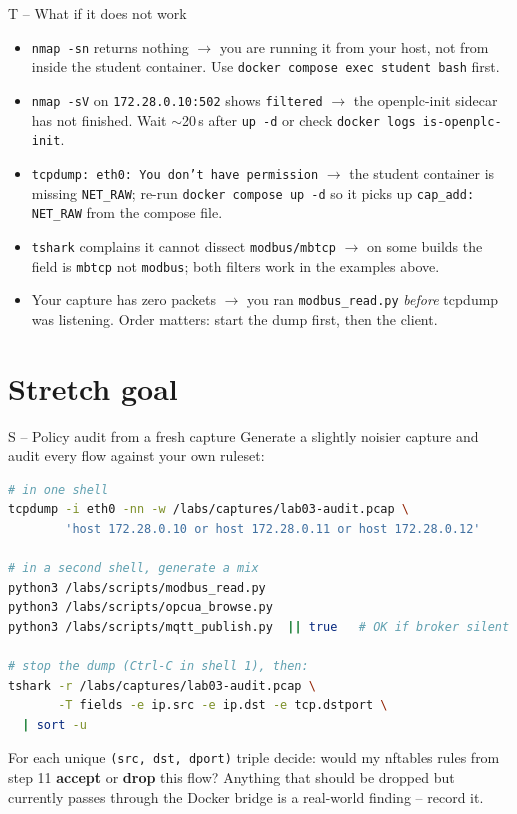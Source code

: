 \documentclass[11pt,a4paper]{article}
\begin{document}
\begin{stepbox}{T -- What if it does not work}
\begin{itemize}\setlength{\itemsep}{2pt}
  \item \texttt{nmap -sn} returns nothing $\rightarrow$ you are running it
        from your host, not from inside the student container. Use
        \texttt{docker compose exec student bash} first.
  \item \texttt{nmap -sV} on \texttt{172.28.0.10:502} shows
        \texttt{filtered} $\rightarrow$ the openplc-init sidecar has not
        finished. Wait $\sim$20\,s after \texttt{up -d} or check
        \texttt{docker logs is-openplc-init}.
  \item \texttt{tcpdump: eth0: You don't have permission} $\rightarrow$
        the student container is missing \texttt{NET\_RAW}; re-run
        \texttt{docker compose up -d} so it picks up
        \texttt{cap\_add: NET\_RAW} from the compose file.
  \item \texttt{tshark} complains it cannot dissect
        \texttt{modbus/mbtcp} $\rightarrow$ on some builds the field
        is \texttt{mbtcp} not \texttt{modbus}; both filters work in the
        examples above.
  \item Your capture has zero packets $\rightarrow$ you ran
        \texttt{modbus\_read.py} \emph{before} tcpdump was listening.
        Order matters: start the dump first, then the client.
\end{itemize}
\end{stepbox}

\section*{Stretch goal}

\begin{stepbox}{S -- Policy audit from a fresh capture}
Generate a slightly noisier capture and audit every flow against your
own ruleset:
\begin{lstlisting}[language=bash]
# in one shell
tcpdump -i eth0 -nn -w /labs/captures/lab03-audit.pcap \
        'host 172.28.0.10 or host 172.28.0.11 or host 172.28.0.12'

# in a second shell, generate a mix
python3 /labs/scripts/modbus_read.py
python3 /labs/scripts/opcua_browse.py
python3 /labs/scripts/mqtt_publish.py  || true   # OK if broker silent

# stop the dump (Ctrl-C in shell 1), then:
tshark -r /labs/captures/lab03-audit.pcap \
       -T fields -e ip.src -e ip.dst -e tcp.dstport \
  | sort -u
\end{lstlisting}

For each unique \texttt{(src, dst, dport)} triple decide: would my
nftables rules from step 11 \textbf{accept} or \textbf{drop} this flow?
Anything that should be dropped but currently passes through the Docker
bridge is a real-world finding -- record it.
\end{stepbox}
\end{document}
